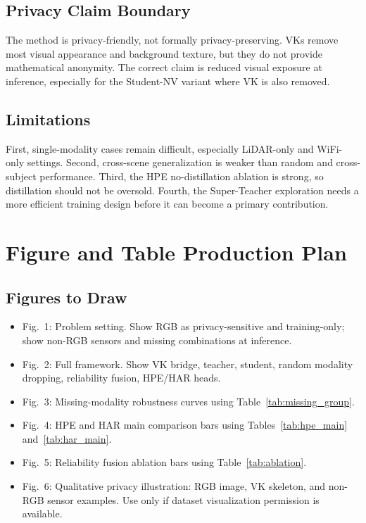 \documentclass[journal]{IEEEtran}
\begin{document}
\subsection{Privacy Claim Boundary}

The method is privacy-friendly, not formally privacy-preserving. VKs remove most visual appearance and background texture, but they do not provide mathematical anonymity. The correct claim is reduced visual exposure at inference, especially for the Student-NV variant where VK is also removed.

\subsection{Limitations}

First, single-modality cases remain difficult, especially LiDAR-only and WiFi-only settings. Second, cross-scene generalization is weaker than random and cross-subject performance. Third, the HPE no-distillation ablation is strong, so distillation should not be oversold. Fourth, the Super-Teacher exploration needs a more efficient training design before it can become a primary contribution.

\section{Figure and Table Production Plan}

\subsection{Figures to Draw}
\begin{itemize}
    \item Fig.~1: Problem setting. Show RGB as privacy-sensitive and training-only; show non-RGB sensors and missing combinations at inference.
    \item Fig.~2: Full framework. Show VK bridge, teacher, student, random modality dropping, reliability fusion, HPE/HAR heads.
    \item Fig.~3: Missing-modality robustness curves using Table~\ref{tab:missing_group}.
    \item Fig.~4: HPE and HAR main comparison bars using Tables~\ref{tab:hpe_main} and~\ref{tab:har_main}.
    \item Fig.~5: Reliability fusion ablation bars using Table~\ref{tab:ablation}.
    \item Fig.~6: Qualitative privacy illustration: RGB image, VK skeleton, and non-RGB sensor examples. Use only if dataset visualization permission is available.
\end{itemize}
\end{document}
